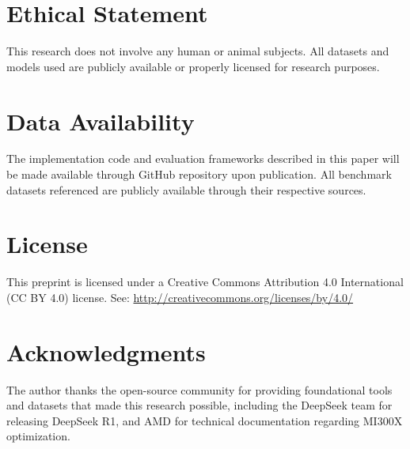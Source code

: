 \documentclass[11pt,a4paper]{article}
\begin{document}
\section*{Ethical Statement}
This research does not involve any human or animal subjects. All datasets and models used are publicly available or properly licensed for research purposes.

\section*{Data Availability}
The implementation code and evaluation frameworks described in this paper will be made available through GitHub repository upon publication. All benchmark datasets referenced are publicly available through their respective sources.

\section*{License}
This preprint is licensed under a Creative Commons Attribution 4.0 International (CC BY 4.0) license. See: \url{http://creativecommons.org/licenses/by/4.0/}

\section*{Acknowledgments}
The author thanks the open-source community for providing foundational tools and datasets that made this research possible, including the DeepSeek team for releasing DeepSeek R1, and AMD for technical documentation regarding MI300X optimization.
\end{document}
